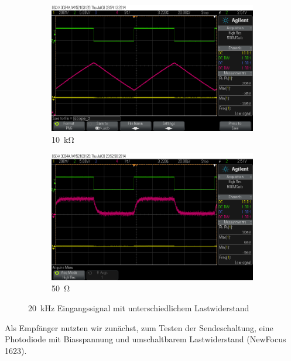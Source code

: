 \documentclass[12pt,a4paper]{article}
\begin{document}
\begin{figure}[H]
  \centering
  \begin{subfigure}[b]{0.6\textwidth}
    \includegraphics[width=\textwidth]{../measurements/20140703/20kHz_10kOhm/scope_2.png}
    \caption{\SI{10}{\kilo\ohm}}
    \label{fig:direct_rx_10k_R}
  \end{subfigure}  
  \begin{subfigure}[b]{0.6\textwidth}
    \includegraphics[width=\textwidth]{../measurements/20140703/20kHz_50_Ohm/scope_0.png}
    \caption{\SI{50}{\ohm}}
    \label{fig:direct_rx_50_R}
  \end{subfigure}  
  \caption{\SI{20}{\kilo\hertz} Eingangssignal mit unterschiedlichem Lastwiderstand}
  \label{fig:direct_rx}
\end{figure}

Als Empfänger nutzten wir zunächst, zum Testen der Sendeschaltung, eine Photodiode mit Biasspannung und umschaltbarem Lastwiderstand (NewFocus 1623).
\end{document}
